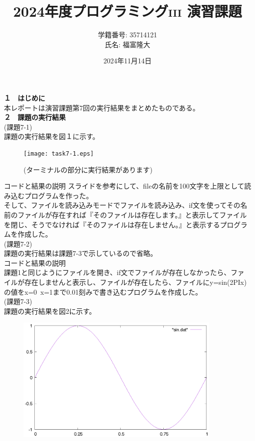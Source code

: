 \documentclass[a4j]{jsarticle}
\title{2024年度プログラミング\textsc{iii} 演習課題}
\author{学籍番号: 35714121 \\ 氏名: 福富隆大}
\date{2024年11月14日}
\begin{document}
\maketitle

\textbf{１　はじめに} \\

本レポートは演習課題第7回の実行結果をまとめたものである。\\

\textbf{２　課題の実行結果} \\

\textmd{(課題7-1)} \\

課題の実行結果を図１に示す。 \\

\begin{figure}[htbp]
  \centering 
  \texttt{[image: task7-1.eps]}
  \caption{(ターミナルの部分に実行結果があります)}
  \label{fig:sample1} %
\end{figure}

\textmd{コードと結果の説明} 
スライドを参考にして、fileの名前を100文字を上限として読み込むプログラムを作った。\\
そして、ファイルを読み込みモードでファイルを読み込み、if文を使ってその名前のファイルが存在すれば『そのファイルは存在します。』と表示してファイルを閉じ、そうでなければ『そのファイルは存在しません。』と表示するプログラムを作成した。\\

\textmd{(課題7-2)} \\

課題の実行結果は課題7-3で示しているので省略。\\

\textmd{コードと結果の説明} \\
課題1と同じようにファイルを開き、if文でファイルが存在しなかったら、ファイルが存在しませんと表示し、ファイルが存在したら、ファイルにy=sin(2PIx)の値をx=0~x=1まで0.01刻みで書き込むプログラムを作成した。\\

\textmd{(課題7-3)} \\

課題の実行結果を図2に示す。 \\

\begin{figure}[htbp]
  \centering 
  \includegraphics[width=10cm]{sin.eps}
  \label{fig:sample2} %
\end{figure}
\end{document}

